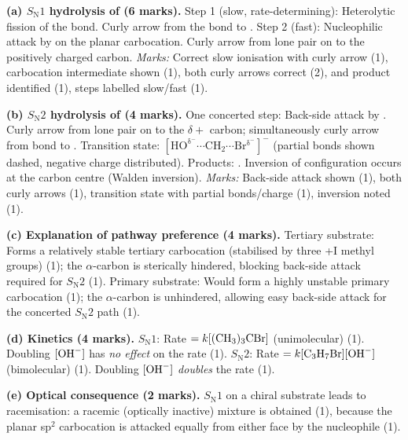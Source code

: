 \documentclass[11pt]{article}
\newcommand{\cle}[1]{{\popxbold\color{popdark}#1}}
\begin{document}
\begin{corrige}
\textbf{(a) $S_{\mathrm{N}}1$ hydrolysis of  (6 marks).}
Step 1 (slow, rate-determining): Heterolytic fission of the  bond. Curly arrow from the  bond to .
Step 2 (fast): Nucleophilic attack by  on the planar carbocation. Curly arrow from lone pair on  to the positively charged carbon.
\textit{Marks:} Correct slow ionisation with curly arrow (1), carbocation intermediate shown (1), both curly arrows correct (2),  and product identified (1), steps labelled slow/fast (1).

\textbf{(b) $S_{\mathrm{N}}2$ hydrolysis of  (4 marks).}
One concerted step: Back-side attack by . Curly arrow from lone pair on  to the $\delta+$ carbon; simultaneously curly arrow from  bond to .
Transition state: $\ensuremath{\mathrm{[HO^{\delta^{-}}\cdots CH_{2} \cdots Br^{\delta^{-}}]^{-}}}$ (partial bonds shown dashed, negative charge distributed).
Products: . \cle{Inversion of configuration} occurs at the carbon centre (Walden inversion).
\textit{Marks:} Back-side attack shown (1), both curly arrows (1), transition state with partial bonds/charge (1), inversion noted (1).

\textbf{(c) Explanation of pathway preference (4 marks).}
Tertiary substrate: Forms a relatively stable tertiary carbocation (stabilised by three +I methyl groups) (1); the $\alpha$-carbon is sterically hindered, blocking back-side attack required for $S_{\mathrm{N}}2$ (1).
Primary substrate: Would form a highly unstable primary carbocation (1); the $\alpha$-carbon is unhindered, allowing easy back-side attack for the concerted $S_{\mathrm{N}}2$ path (1).

\textbf{(d) Kinetics (4 marks).}
$S_{\mathrm{N}}1$: Rate $= k[\ce{(CH3)3CBr}]$ (unimolecular) (1). Doubling $[\ce{OH-}]$ has \emph{no effect} on the rate (1).
$S_{\mathrm{N}}2$: Rate $= k[\ce{C3H7Br}][\ce{OH-}]$ (bimolecular) (1). Doubling $[\ce{OH-}]$ \emph{doubles} the rate (1).

\textbf{(e) Optical consequence (2 marks).}
$S_{\mathrm{N}}1$ on a chiral substrate leads to \cle{racemisation}: a racemic (optically inactive) mixture is obtained (1), because the planar \cle{sp$^{2}$} carbocation is attacked equally from either face by the nucleophile (1).
\end{corrige}
\end{document}
